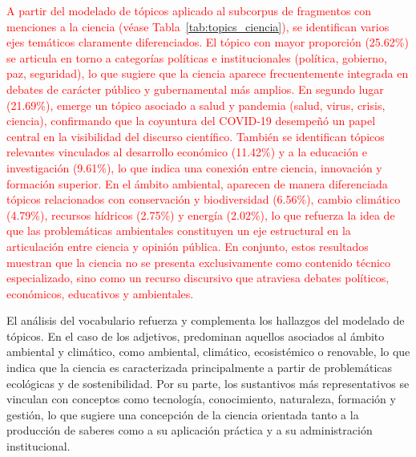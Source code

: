 \documentclass[11pt,a4paper]{article}
\begin{document}
\textcolor{red}{A partir del modelado de tópicos aplicado al subcorpus de fragmentos con menciones a la ciencia (véase Tabla~\ref{tab:topics_ciencia}), se identifican varios ejes temáticos claramente diferenciados. El tópico con mayor proporción (25.62\%) se articula en torno a categorías políticas e institucionales (política, gobierno, paz, seguridad), lo que sugiere que la ciencia aparece frecuentemente integrada en debates de carácter público y gubernamental más amplios. En segundo lugar (21.69\%), emerge un tópico asociado a salud y pandemia (salud, virus, crisis, ciencia), confirmando que la coyuntura del COVID-19 desempeñó un papel central en la visibilidad del discurso científico. También se identifican tópicos relevantes vinculados al desarrollo económico (11.42\%) y a la educación e investigación (9.61\%), lo que indica una conexión entre ciencia, innovación y formación superior. En el ámbito ambiental, aparecen de manera diferenciada tópicos relacionados con conservación y biodiversidad (6.56\%), cambio climático (4.79\%), recursos hídricos (2.75\%) y energía (2.02\%), lo que refuerza la idea de que las problemáticas ambientales constituyen un eje estructural en la articulación entre ciencia y opinión pública. En conjunto, estos resultados muestran que la ciencia no se presenta exclusivamente como contenido técnico especializado, sino como un recurso discursivo que atraviesa debates políticos, económicos, educativos y ambientales.}



El análisis del vocabulario refuerza y complementa los hallazgos del modelado de tópicos. En el caso de los adjetivos, predominan aquellos asociados al ámbito ambiental y climático, como ambiental, climático, ecosistémico o renovable, lo que indica que la ciencia es caracterizada principalmente a partir de problemáticas ecológicas y de sostenibilidad. Por su parte, los sustantivos más representativos se vinculan con conceptos como tecnología, conocimiento, naturaleza, formación y gestión, lo que sugiere una concepción de la ciencia orientada tanto a la producción de saberes como a su aplicación práctica y a su administración institucional.
\end{document}
